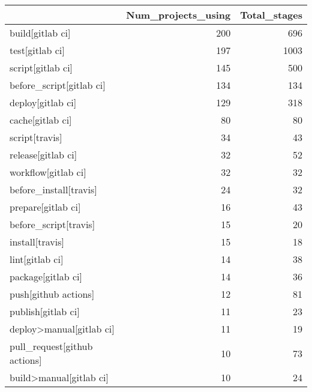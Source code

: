 \begin{tabular}{lrr}
\toprule
{} &  Num\_projects\_using &  Total\_stages \\
\midrule
build[gitlab ci]                           &                 200 &           696 \\
test[gitlab ci]                            &                 197 &          1003 \\
script[gitlab ci]                          &                 145 &           500 \\
before\_script[gitlab ci]                   &                 134 &           134 \\
deploy[gitlab ci]                          &                 129 &           318 \\
cache[gitlab ci]                           &                  80 &            80 \\
script[travis]                             &                  34 &            43 \\
release[gitlab ci]                         &                  32 &            52 \\
workflow[gitlab ci]                        &                  32 &            32 \\
before\_install[travis]                     &                  24 &            32 \\
prepare[gitlab ci]                         &                  16 &            43 \\
before\_script[travis]                      &                  15 &            20 \\
install[travis]                            &                  15 &            18 \\
lint[gitlab ci]                            &                  14 &            38 \\
package[gitlab ci]                         &                  14 &            36 \\
push[github actions]                       &                  12 &            81 \\
publish[gitlab ci]                         &                  11 &            23 \\
deploy>manual[gitlab ci]                   &                  11 &            19 \\
pull\_request[github actions]               &                  10 &            73 \\
build>manual[gitlab ci]                    &                  10 &            24 \\

\end{tabular}
